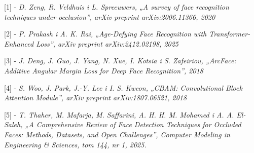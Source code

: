 [1] - \textit{D. Zeng, R. Veldhuis i L. Spreeuwers, „A survey of face recognition techniques under occlusion”, arXiv preprint arXiv:2006.11366, 2020}

[2] - \textit{P. Prakash i A. K. Rai, „Age-Defying Face Recognition with Transformer-Enhanced Loss”, arXiv preprint arXiv:2412.02198, 2025}

[3] - \textit{J. Deng, J. Guo, J. Yang, N. Xue, I. Kotsia i S. Zafeiriou, „ArcFace: Additive Angular Margin Loss for Deep Face Recognition”, 2018}

[4] - \textit{S. Woo, J. Park, J.-Y. Lee i I. S. Kweon, „CBAM: Convolutional Block Attention Module”, arXiv preprint arXiv:1807.06521, 2018}

[5] - \textit{T. Thaher, M. Mafarja, M. Saffarini, A. H. H. M. Mohamed i A. A. El-Saleh, „A Comprehensive Review of Face Detection Techniques for Occluded Faces: Methods, Datasets, and Open Challenges”, Computer Modeling in Engineering \& Sciences, tom 144, nr 1, 2025.}